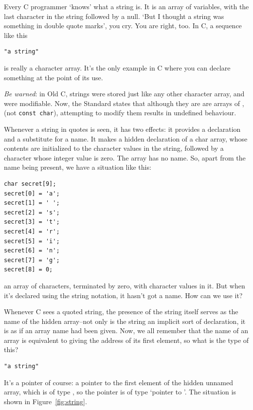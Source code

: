    Every C programmer `knows' what a string is. It is an array of
    \kchar{} variables, with the last character in the string
    followed by a null. `But I thought a string was something in double
    quote marks', you cry. You are right, too. In C, a sequence like
    this


   \begin{Verbatim}
"a string"
\end{Verbatim}

   is really a character array. It's the only example in C where you can
    declare something at the point of its use.


   \textit{Be warned}: in Old C, strings were stored just like any other
    character array, and were modifiable. Now, the Standard states that
    although they are are arrays of \kchar, (not \texttt{const
    char}), attempting to modify them results in undefined
    behaviour.


   Whenever a string in quotes is seen, it has two effects: it provides
    a declaration and a substitute for a name. It makes a hidden declaration
    of a char array, whose contents are initialized to the character values
    in the string, followed by a character whose integer value is zero. The
    array has no name. So, apart from the name being present, we have
    a situation like this:


   \begin{Verbatim}
char secret[9];
secret[0] = 'a';
secret[1] = ' ';
secret[2] = 's';
secret[3] = 't';
secret[4] = 'r';
secret[5] = 'i';
secret[6] = 'n';
secret[7] = 'g';
secret[8] = 0;
\end{Verbatim}

   an array of characters, terminated by zero, with character values in
    it. But when it's declared using the string notation, it hasn't got
    a name. How can we use it?


   Whenever C sees a quoted string, the presence of the string itself
    serves as the name of the hidden array--not only is the string an
    implicit sort of declaration, it is as if an array name had been given.
    Now, we all remember that the name of an array is equivalent to giving
    the address of its first element, so what is the type of this?


   \begin{Verbatim}
"a string"
\end{Verbatim}

   It's a pointer of course: a pointer to the first element of the hidden
    unnamed array, which is of type \kchar, so the pointer is of
    type `pointer to \kchar'. The situation is shown in
    Figure~\ref{fig:string}.


